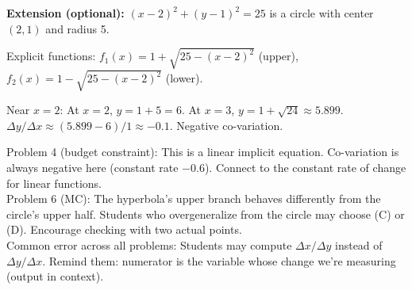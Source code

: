 \documentclass[10pt]{article}
\begin{document}
\vspace{0.08in}

\begin{extensionbox}
\textbf{Extension (optional):}
$(x-2)^2 + (y-1)^2 = 25$ is a circle with center $(2, 1)$ and radius 5.

Explicit functions:
$f_1(x) = 1 + \sqrt{25-(x-2)^2}$ (upper), $f_2(x) = 1 - \sqrt{25-(x-2)^2}$ (lower).

Near $x = 2$: At $x = 2$, $y = 1 + 5 = 6$. At $x = 3$, $y = 1 + \sqrt{24} \approx 5.899$.
$\Delta y/\Delta x \approx (5.899 - 6)/1 \approx -0.1$. Negative co-variation.
\end{extensionbox}

\begin{teachernote}
Problem 4 (budget constraint): This is a linear implicit equation. Co-variation is always negative here (constant rate $-0.6$). Connect to the constant rate of change for linear functions.\\[3pt]
Problem 6 (MC): The hyperbola's upper branch behaves differently from the circle's upper half. Students who overgeneralize from the circle may choose (C) or (D). Encourage checking with two actual points.\\[3pt]
Common error across all problems: Students may compute $\Delta x/\Delta y$ instead of $\Delta y/\Delta x$. Remind them: numerator is the variable whose change we're measuring (output in context).
\end{teachernote}
\end{document}

